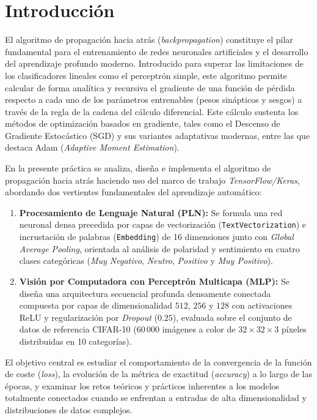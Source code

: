 \documentclass[12pt]{article}
\begin{document}
\section{Introducción}
El algoritmo de propagación hacia atrás (\textit{backpropagation}) constituye el pilar fundamental para el entrenamiento de redes neuronales artificiales y el desarrollo del aprendizaje profundo moderno. Introducido para superar las limitaciones de los clasificadores lineales como el perceptrón simple, este algoritmo permite calcular de forma analítica y recursiva el gradiente de una función de pérdida respecto a cada uno de los parámetros entrenables (pesos sinápticos y sesgos) a través de la regla de la cadena del cálculo diferencial. Este cálculo sustenta los métodos de optimización basados en gradiente, tales como el Descenso de Gradiente Estocástico (SGD) y sus variantes adaptativas modernas, entre las que destaca Adam (\textit{Adaptive Moment Estimation}).

En la presente práctica se analiza, diseña e implementa el algoritmo de propagación hacia atrás haciendo uso del marco de trabajo \textit{TensorFlow/Keras}, abordando dos vertientes fundamentales del aprendizaje automático:
\begin{enumerate}
	\item \textbf{Procesamiento de Lenguaje Natural (PLN):} Se formula una red neuronal densa precedida por capas de vectorización (\texttt{TextVectorization}) e incrustación de palabras (\texttt{Embedding}) de 16 dimensiones junto con \textit{Global Average Pooling}, orientada al análisis de polaridad y sentimiento en cuatro clases categóricas (\textit{Muy Negativo}, \textit{Neutro}, \textit{Positivo} y \textit{Muy Positivo}).
	\item \textbf{Visión por Computadora con Perceptrón Multicapa (MLP):} Se diseña una arquitectura secuencial profunda densamente conectada compuesta por capas de dimensionalidad $512$, $256$ y $128$ con activaciones ReLU y regularización por \textit{Dropout} ($0.25$), evaluada sobre el conjunto de datos de referencia CIFAR-10 ($60\,000$ imágenes a color de $32\times 32\times 3$ píxeles distribuidas en 10 categorías).
\end{enumerate}

El objetivo central es estudiar el comportamiento de la convergencia de la función de coste (\textit{loss}), la evolución de la métrica de exactitud (\textit{accuracy}) a lo largo de las épocas, y examinar los retos teóricos y prácticos inherentes a los modelos totalmente conectados cuando se enfrentan a entradas de alta dimensionalidad y distribuciones de datos complejos.
\end{document}
